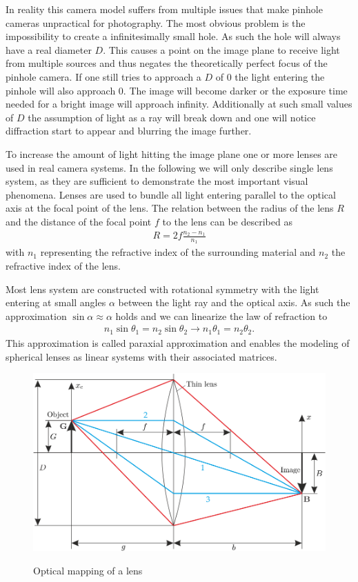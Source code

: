 In reality this camera model suffers from multiple issues that make pinhole cameras unpractical for photography.
The most obvious problem is the impossibility to create a infinitesimally small hole.
As such the hole will always have a real diameter $D$.
This causes a point on the image plane to receive light from multiple sources and thus negates the theoretically perfect focus of the pinhole camera.
If one still tries to approach a $D$ of $0$ the light entering the pinhole will also approach $0$.
The image will become darker or the exposure time needed for a bright image will approach infinity.
Additionally at such small values of $D$ the assumption of light as a ray will break down and one will notice diffraction start to appear and blurring the image further. \cite{Beyerer.2016}

To increase the amount of light hitting the image plane one or more lenses are used in real camera systems.
In the following we will only describe single lens system, as they are sufficient to demonstrate the most important visual phenomena.
Lenses are used to bundle all light entering parallel to the optical axis at the focal point of the lens.
The relation between the radius of the lens $R$ and the distance of the focal point $f$ to the lens can be described as
\begin{align}
    R = 2 f \frac{n_2 - n_1}{n_1}
\end{align}
with $n_1$ representing the refractive index of the surrounding material and $n_2$ the refractive index of the lens. \cite{Beyerer.2016}

Most lens system are constructed with rotational symmetry with the light entering at small angles $\alpha$ between the light ray and the optical axis.
As such the approximation $\sin  \alpha \approx \alpha$ holds and we can linearize the law of refraction to
\begin{align}
    n_1 \sin \theta_1 = n_2 \sin \theta_2 \rightarrow n_1 \theta_1 = n_2 \theta_2.
\end{align}
This approximation is called paraxial approximation and enables the modeling of spherical lenses as linear systems with their associated matrices. \cite{Beyerer.2016}

\begin{figure}[h]
    \centering
    \includegraphics[width=\textwidth]{images/thin-lens-tl.png}
    \caption{Optical mapping of a lens}
    \label{fig:thin-lens}
    \cite{Beyerer.2016}
\end{figure}

